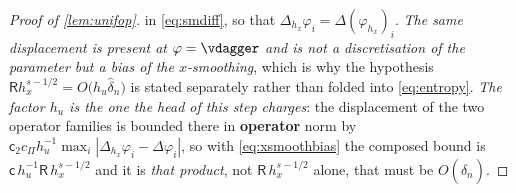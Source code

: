 \begin{proof}[Proof of \cref{lem:unifop}]
in \eqref{eq:smdiff}, so that $\Delta_{h_x}\varphi_i=\Delta(\varphi_{h_x})_i$. \emph{The same displacement is
present at $\varphi=\vdagger$ and is not a discretisation of the parameter but a bias of the
$x$-smoothing}, which is why the hypothesis $\mathsf R h_x^{s-1/2}=O\big(h_u\hat\delta_n\big)$ is stated
separately rather than folded into \eqref{eq:entropy}. \emph{The factor $h_u$ is the one the head of
this step charges}: the displacement of the two operator families is bounded there in \textbf{operator}
norm by $\mathsf c_2c_\Pi h_u^{-1}\max_i|\Delta_{h_x}\varphi_i-\Delta\varphi_i|$, so with
\eqref{eq:xsmoothbias} the composed bound is $\mathsf c\,h_u^{-1}\mathsf R\,h_x^{s-1/2}$ and it is
\emph{that product}, not $\mathsf R\,h_x^{s-1/2}$ alone, that must be $O(\hat\delta_n)$.
\end{proof}

